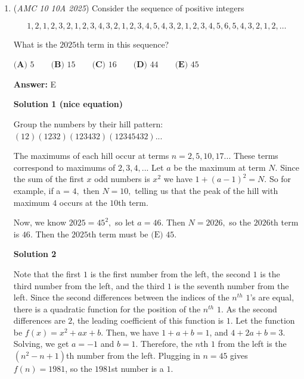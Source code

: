 \begin{enumerate}
 



\textbf{Solution 4 (Cheese)}

Because the change in the kids group is less, you can assume that either there are more kids or the number is closer to the kids. If you try out 28 (Smallest number), with 7 kids, you notice the change is greater than the change in the mean of the kids ages in the problem, meaning that there must be 8 kids. Now know that there are 8 kids, to change the age by 2 the age of Ash must be 16 more than the average (because it changes by one for every 8, due to there being 8 kids), meaning Ash's age is 12 + 16, or $\boxed{28}$ (which is answer choice $\boxed{A}$).~ToxicWaste

 


 


	\item (\textit{AMC 10 10A 2025}) Consider the sequence of positive integers


 
 \[1,2,1,2,3,2,1,2,3,4,3,2,1,2,3,4,5,4,3,2,1,2,3,4,5,6,5,4,3,2,1,2,\dots\]


 What is the $2025$th term in this sequence?


 $\textbf{(A) } 5 \qquad\textbf{(B) } 15 \qquad\textbf{(C) } 16 \qquad\textbf{(D) } 44 \qquad\textbf{(E) } 45$

 \textbf{Answer: }E



\textbf{Solution 1 (nice equation)}

Group the numbers by their hill pattern: $(12)(1232)(123432)(12345432)...$

 The maximums of each hill occur at terms  $n = 2, 5, 10, 17...$ These terms correspond to maximums of $2, 3, 4,...$ Let $a$ be the maximum at term $N$. Since the sum of the first $x$ odd numbers is $x^2$ we have $1 + (a-1)^2 = N.$ So for example, if a = $4,$ then $N = 10,$ telling us that the peak of the hill with maximum $4$ occurs at the $10$th term.  

 Now, we know $2025 = 45^2,$ so let $a = 46.$ Then $N = 2026,$ so the $2026$th term is $46.$ Then the $2025$th term must be $\boxed{\text{(E) }45}.$




\textbf{Solution 2}

Note that the first $1$ is the first number from the left, the second $1$ is the third number from the left, and the third $1$ is the seventh number from the left. Since the second differences between the indices of the $n^{th}$ $1$’s are equal, there is a quadratic function for the position of the $n^{th}$ $1$. As the second differences are $2$, the leading coefficient of this function is $1$. Let the function be $f(x)=x^2+ax+b$. Then, we have $1+a+b=1$, and $4+2a+b=3$. Solving, we get $a=-1$ and $b=1$. Therefore, the $n$th $1$ from the left is the $(n^2-n+1)$th number from the left. Plugging in $n=45$ gives $f(n)=1981$, so the $1981$st number is a $1$. 


\end{enumerate}
